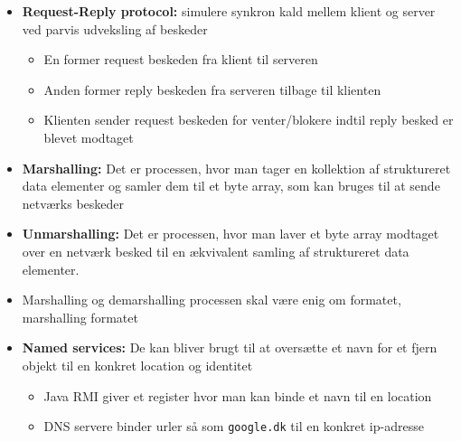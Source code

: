 \documentclass[a4, english]{article}
\begin{document}
\begin{itemize}
  \item \textbf{Request-Reply protocol:} simulere synkron kald mellem klient og server ved parvis udveksling af beskeder
  \begin{itemize}
  	\item En former request beskeden fra klient til serveren
    \item Anden former reply beskeden fra serveren tilbage til klienten
    \item Klienten sender request beskeden for venter/blokere indtil reply besked er blevet modtaget
  \end{itemize}
  \item \textbf{Marshalling:} Det er processen, hvor man tager en kollektion af struktureret data elementer og samler dem til et byte array, som kan bruges til at sende netværks beskeder
  \item \textbf{Unmarshalling:} Det er processen, hvor man laver et byte array modtaget over en netværk besked til en ækvivalent samling af struktureret data elementer.
  \item Marshalling og demarshalling processen skal være enig om formatet, marshalling formatet 
  \item \textbf{Named services:} De kan bliver brugt til at oversætte et navn for et fjern objekt til en konkret location og identitet 
  \begin{itemize}
  	\item Java RMI giver et register hvor man kan binde et navn til en location
    \item DNS servere binder urler så som \texttt{google.dk} til en konkret ip-adresse
  \end{itemize}
\end{itemize}
\end{document}
